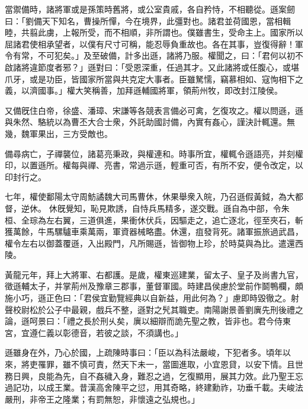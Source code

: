 \begin{pinyinscope}
 
 
 
 當禦備時，諸將軍或是孫策時舊將，或公室貴戚，各自矜恃，不相聽從。遜案劒曰：「劉備天下知名，曹操所憚，今在境界，此彊對也。諸君並荷國恩，當相輯睦，共翦此虜，上報所受，而不相順，非所謂也。僕雖書生，受命主上。國家所以屈諸君使相承望者，以僕有尺寸可稱，能忍辱負重故也。各在其事，豈復得辭！軍令有常，不可犯矣。」及至破備，計多出遜，諸將乃服。權聞之，曰：「君何以初不啟諸將違節度者邪？」遜對曰：「受恩深重，任過其才。又此諸將或任腹心，或堪爪牙，或是功臣，皆國家所當與共克定大事者。臣雖駑懦，竊慕相如、寇恂相下之義，以濟國事。」權大笑稱善，加拜遜輔國將軍，領荊州牧，即改封江陵侯。
 
 
又備旣住白帝，徐盛、潘璋、宋謙等各競表言備必可禽，乞復攻之。權以問遜，遜與朱然、駱統以為曹丕大合士衆，外託助國討備，內實有姦心，謹決計輒還。無幾，魏軍果出，三方受敵也。
 
 
 
 
 備尋病亡，子禪襲位，諸葛亮秉政，與權連和。時事所宜，權輒令遜語亮，并刻權印，以置遜所。權每與禪、亮書，常過示遜，輕重可否，有所不安，便令改定，以印封行之。
 
 
七年，權使鄱陽太守周魴譎魏大司馬曹休，休果舉衆入皖，乃召遜假黃鉞，為大都督，逆休。
 休旣覺知，恥見欺誘，自恃兵馬精多，遂交戰。遜自為中部，令朱桓、全琮為左右翼，三道俱進，果衝休伏兵，因驅走之，追亡逐北，徑至夾石，斬獲萬餘，牛馬騾驢車乘萬兩，軍資器械略盡。休還，疽發背死。諸軍振旅過武昌，權令左右以御蓋覆遜，入出殿門，凡所賜遜，皆御物上珍，於時莫與為比。遣還西陵。
 
 
 
 
 黃龍元年，拜上大將軍、右都護。是歲，權東巡建業，留太子、皇子及尚書九官，徵遜輔太子，并掌荊州及豫章三郡事，董督軍國。時建昌侯慮於堂前作鬬鴨欄，頗施小巧，遜正色曰：「君侯宜勤覽經典以自新益，用此何為？」慮即時毀徹之。射聲校尉松於公子中最親，戲兵不整，遜對之髠其職吏。南陽謝景善劉廙先刑後禮之論，遜呵景曰：「禮之長於刑乆矣，廙以細辯而詭先聖之教，皆非也。君今侍東宮，宜遵仁義以彰德音，若彼之談，不須講也。」
 
 
 
 
 遜雖身在外，乃心於國，上疏陳時事曰：「臣以為科法嚴峻，下犯者多。頃年以來，將吏罹罪，雖不慎可責，然天下未一，當圖進取，小宜恩貸，以安下情。且世務日興，良能為先，自不姦穢入身，難忍之過，乞復顯用，展其力效。此乃聖王忘過記功，以成王業。昔漢高舍陳平之愆，用其奇略，終建勳祚，功垂千載。夫峻法嚴刑，非帝王之隆業；有罰無恕，非懷遠之弘規也。」
 

\end{pinyinscope}
